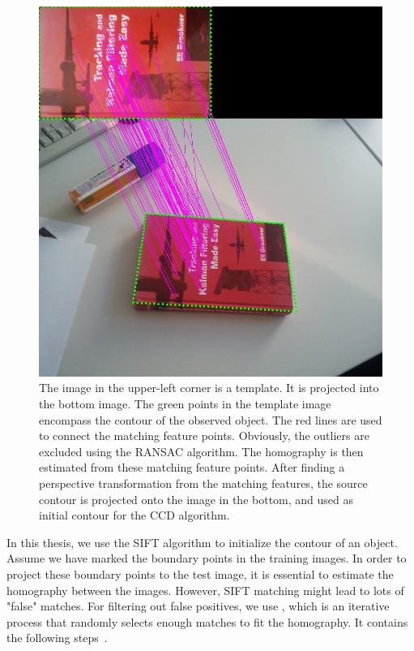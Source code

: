 \begin{figure}[htbp]
  \centering
\includegraphics[width=12cm]{images/sift.jpg}
\caption[Contour initialization using the SIFT algorithm]{The image in
  the upper-left corner is a template. It is projected into the bottom
  image. The green points in the template image encompass the
  contour of the observed object. The red lines are used to connect the matching feature
  points. Obviously, the outliers are excluded using the RANSAC
  algorithm. The homography is then estimated from these matching
  feature points.  After finding a perspective
  transformation from the matching features, the source contour is
  projected onto the image in the bottom, and used as initial contour
  for the CCD algorithm.}
\label{fig:sift}
\end{figure}

In this thesis, we use the SIFT algorithm to initialize the
contour of an object. Assume we have marked the boundary points in the
training images. In order to project these boundary points to the test
image, it is essential to estimate the homography between the
images. However, SIFT matching
might lead to lots of "false" matches. %
For filtering out false positives, we use , which is an
iterative process that randomly selects enough matches to fit the
homography. It contains the following steps~\cite{fischler1981random}.

